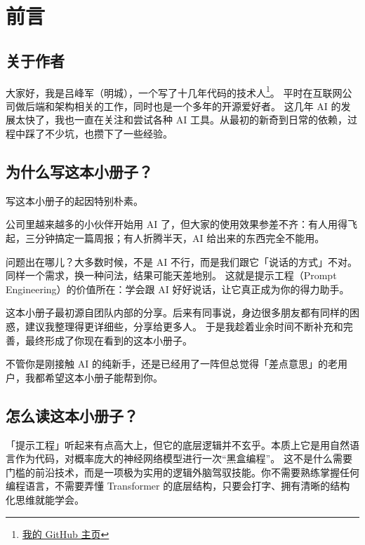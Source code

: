 % 
% 


\chapter*{前言}

\section*{关于作者}

大家好，我是吕峰军（明城），一个写了十几年代码的技术人\footnote{\href{https://github.com/mingcheng}{我的 GitHub 主页}}。
平时在互联网公司做后端和架构相关的工作，同时也是一个多年的开源爱好者。
这几年 AI 的发展太快了，我也一直在关注和尝试各种 AI 工具。从最初的新奇到日常的依赖，过程中踩了不少坑，也攒下了一些经验。

\section*{为什么写这本小册子？}

写这本小册子的起因特别朴素。

公司里越来越多的小伙伴开始用 AI 了，但大家的使用效果参差不齐：有人用得飞起，三分钟搞定一篇周报；有人折腾半天，AI 给出来的东西完全不能用。

问题出在哪儿？大多数时候，不是 AI 不行，而是我们跟它「说话的方式」不对。
同样一个需求，换一种问法，结果可能天差地别。
这就是提示工程（Prompt Engineering）的价值所在：学会跟 AI 好好说话，让它真正成为你的得力助手。

这本小册子最初源自团队内部的分享。后来有同事说，身边很多朋友都有同样的困惑，建议我整理得更详细些，分享给更多人。
于是我趁着业余时间不断补充和完善，最终形成了你现在看到的这本小册子。

不管你是刚接触 AI 的纯新手，还是已经用了一阵但总觉得「差点意思」的老用户，我都希望这本小册子能帮到你。

\section*{怎么读这本小册子？}

「提示工程」听起来有点高大上，但它的底层逻辑并不玄乎。本质上它是用自然语言作为代码，对概率庞大的神经网络模型进行一次“黑盒编程”。
这不是什么需要门槛的前沿技术，而是一项极为实用的逻辑外脑驾驭技能。你不需要熟练掌握任何编程语言，不需要弄懂 Transformer 的底层结构，只要会打字、拥有清晰的结构化思维就能学会。

